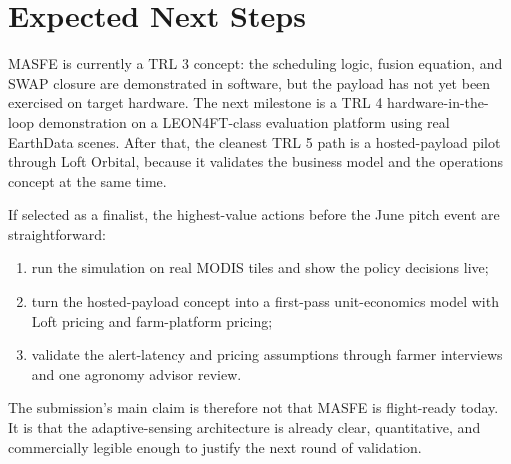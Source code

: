\section{Expected Next Steps}

MASFE is currently a TRL 3 concept: the scheduling logic, fusion equation, and SWAP closure are demonstrated in software, but the payload has not yet been exercised on target hardware. The next milestone is a TRL 4 hardware-in-the-loop demonstration on a LEON4FT-class evaluation platform using real EarthData scenes. After that, the cleanest TRL 5 path is a hosted-payload pilot through Loft Orbital, because it validates the business model and the operations concept at the same time.

If selected as a finalist, the highest-value actions before the June pitch event are straightforward:
\begin{enumerate}
  \item run the simulation on real MODIS tiles and show the policy decisions live;
  \item turn the hosted-payload concept into a first-pass unit-economics model with Loft pricing and farm-platform pricing;
  \item validate the alert-latency and pricing assumptions through farmer interviews and one agronomy advisor review.
\end{enumerate}

The submission's main claim is therefore not that MASFE is flight-ready today. It is that the adaptive-sensing architecture is already clear, quantitative, and commercially legible enough to justify the next round of validation.
